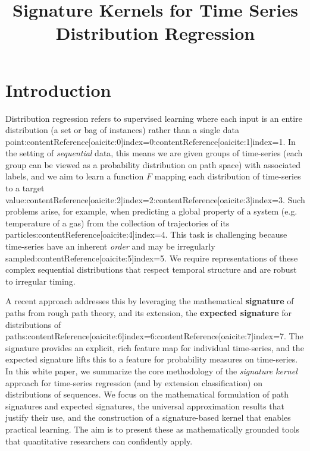 \documentclass[11pt]{article}
\begin{document}
\title{Signature Kernels for Time Series Distribution Regression}
\author{}
\date{}
\maketitle

\section{Introduction}
Distribution regression refers to supervised learning where each input is an entire distribution (a set or bag of instances) rather than a single data point:contentReference[oaicite:0]{index=0}:contentReference[oaicite:1]{index=1}. In the setting of \emph{sequential} data, this means we are given groups of time-series (each group can be viewed as a probability distribution on path space) with associated labels, and we aim to learn a function $F$ mapping each distribution of time-series to a target value:contentReference[oaicite:2]{index=2}:contentReference[oaicite:3]{index=3}. Such problems arise, for example, when predicting a global property of a system (e.g. temperature of a gas) from the collection of trajectories of its particles:contentReference[oaicite:4]{index=4}. This task is challenging because time-series have an inherent \emph{order} and may be irregularly sampled:contentReference[oaicite:5]{index=5}. We require representations of these complex sequential distributions that respect temporal structure and are robust to irregular timing. 

A recent approach addresses this by leveraging the mathematical \textbf{signature} of paths from rough path theory, and its extension, the \textbf{expected signature} for distributions of paths:contentReference[oaicite:6]{index=6}:contentReference[oaicite:7]{index=7}. The signature provides an explicit, rich feature map for individual time-series, and the expected signature lifts this to a feature for probability measures on time-series. In this white paper, we summarize the core methodology of the \emph{signature kernel} approach for time-series regression (and by extension classification) on distributions of sequences. We focus on the mathematical formulation of path signatures and expected signatures, the universal approximation results that justify their use, and the construction of a signature-based kernel that enables practical learning. The aim is to present these as mathematically grounded tools that quantitative researchers can confidently apply.
\end{document}
